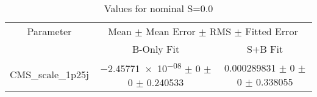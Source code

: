 \begin{table}
\centering
\caption{Values for nominal S=0.0}
\begin{tabular}{ccc}
\toprule
Parameter & \multicolumn{2}{c}{Mean $\pm$ Mean Error $\pm$ RMS $\pm$ Fitted Error}\\
 & B-Only Fit & S+B Fit\\
\midrule
CMS\_scale\_1p25j & \num{-2.45771e-08} $\pm$ \num{0} $\pm$ \num{0} $\pm$ \num{0.240533} & \num{0.000289831} $\pm$ \num{0} $\pm$ \num{0} $\pm$ \num{0.338055}\\
\bottomrule
\end{tabular}
\end{table}